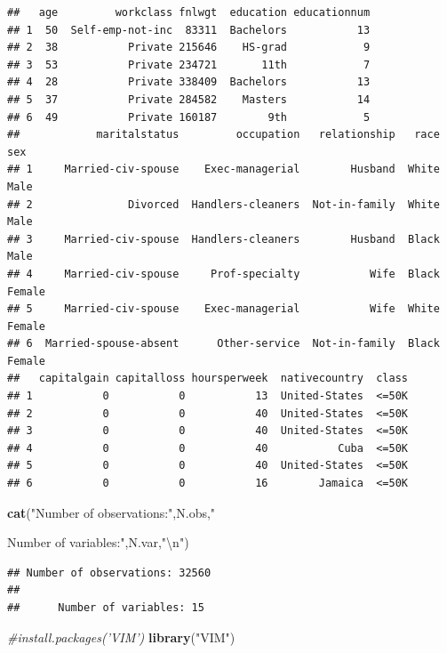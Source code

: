 \documentclass[]{article}
\newenvironment{Shaded}{\begin{snugshade}}{\end{snugshade}}
\newcommand{\KeywordTok}[1]{\textcolor[rgb]{0.13,0.29,0.53}{\textbf{#1}}}
\newcommand{\CharTok}[1]{\textcolor[rgb]{0.31,0.60,0.02}{#1}}
\newcommand{\StringTok}[1]{\textcolor[rgb]{0.31,0.60,0.02}{#1}}
\newcommand{\CommentTok}[1]{\textcolor[rgb]{0.56,0.35,0.01}{\textit{#1}}}
\newcommand{\NormalTok}[1]{#1}
\begin{document}
\begin{verbatim}
##   age         workclass fnlwgt  education educationnum
## 1  50  Self-emp-not-inc  83311  Bachelors           13
## 2  38           Private 215646    HS-grad            9
## 3  53           Private 234721       11th            7
## 4  28           Private 338409  Bachelors           13
## 5  37           Private 284582    Masters           14
## 6  49           Private 160187        9th            5
##            maritalstatus         occupation   relationship   race     sex
## 1     Married-civ-spouse    Exec-managerial        Husband  White    Male
## 2               Divorced  Handlers-cleaners  Not-in-family  White    Male
## 3     Married-civ-spouse  Handlers-cleaners        Husband  Black    Male
## 4     Married-civ-spouse     Prof-specialty           Wife  Black  Female
## 5     Married-civ-spouse    Exec-managerial           Wife  White  Female
## 6  Married-spouse-absent      Other-service  Not-in-family  Black  Female
##   capitalgain capitalloss hoursperweek  nativecountry  class
## 1           0           0           13  United-States  <=50K
## 2           0           0           40  United-States  <=50K
## 3           0           0           40  United-States  <=50K
## 4           0           0           40           Cuba  <=50K
## 5           0           0           40  United-States  <=50K
## 6           0           0           16        Jamaica  <=50K
\end{verbatim}

\begin{Shaded}
\begin{Highlighting}[]
  \KeywordTok{cat}\NormalTok{(}\StringTok{"Number of observations:"}\NormalTok{,N.obs,}\StringTok{"}

\StringTok{     Number of variables:"}\NormalTok{,N.var,}\StringTok{"}\CharTok{\textbackslash{}n}\StringTok{"}\NormalTok{)}
\end{Highlighting}
\end{Shaded}

\begin{verbatim}
## Number of observations: 32560 
## 
##      Number of variables: 15
\end{verbatim}

\begin{Shaded}
\begin{Highlighting}[]
\CommentTok{#install.packages('VIM')}
\KeywordTok{library}\NormalTok{(}\StringTok{"VIM"}\NormalTok{)}
\end{Highlighting}
\end{Shaded}
\end{document}
